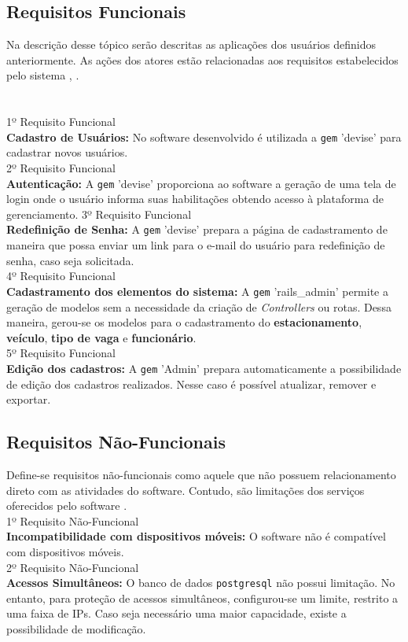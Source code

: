  \subsection{ Requisitos Funcionais}
 \label{Requisitos Funcionais}
 Na descrição desse tópico serão descritas as aplicações dos usuários definidos anteriormente.
As ações dos atores estão relacionadas aos requisitos estabelecidos pelo sistema \cite{SOMMERVILLE}, \cite{pressman2016engenharia}.\\\\\\1º Requisito Funcional\\
 \textbf{Cadastro de Usuários:} No software desenvolvido é utilizada a \texttt{gem} 'devise'  para cadastrar novos usuários.\\
 2º Requisito Funcional\\
 \textbf{Autenticação:}  A  \texttt{gem} 'devise' proporciona ao software a geração de uma tela de login onde o usuário
 informa suas habilitações obtendo acesso à plataforma de gerenciamento.
 3º Requisito Funcional\\
 \textbf{Redefinição de Senha:} A  \texttt{gem} 'devise' prepara a página de cadastramento de maneira que possa  enviar um link para o e-mail do usuário para redefinição de senha, caso seja solicitada.\\
  4º Requisito Funcional\\
 \textbf{Cadastramento dos elementos do sistema:}
 A  \texttt{gem} 'rails\_admin' permite a geração de modelos sem a necessidade da criação de \textit{Controllers} ou rotas. Dessa maneira, gerou-se os modelos para o cadastramento do \textbf{estacionamento}, \textbf{veículo},
 \textbf{tipo de vaga} e
 \textbf{funcionário}.\\
 5º Requisito Funcional\\
 \textbf{Edição dos cadastros:}  A  \texttt{gem} 'Admin' prepara automaticamente a possibilidade de edição dos cadastros realizados. Nesse caso é possível atualizar, remover e exportar.
 
 \subsection{Requisitos Não-Funcionais}
 Define-se requisitos não-funcionais como aquele que não possuem relacionamento direto com
 as atividades do software. Contudo, são limitações dos serviços oferecidos pelo
 software \cite{rezende2006engenharia}.\\
 1º Requisito Não-Funcional\\
 \textbf{Incompatibilidade com dispositivos móveis:}
 O software não é compatível com dispositivos móveis.\\
 2º Requisito Não-Funcional\\
 \textbf{Acessos Simultâneos:}
 O banco de dados \texttt{postgresql} não possui limitação. No entanto, para proteção de acessos simultâneos, configurou-se um limite, restrito a uma faixa de IPs. Caso seja necessário uma maior capacidade, existe a possibilidade de modificação.
 
